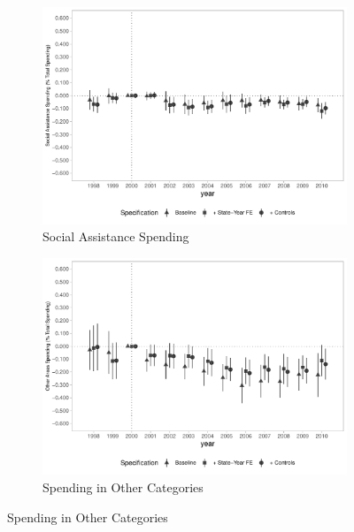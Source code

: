 \begin{figure}[h]
\begin{center}
\begin{subfigure}{0.32\textwidth}
        \centering
        \caption{\scriptsize Social Assistance Spending}\label{fig:finbra4_e}
        \includegraphics[width=\textwidth]{plots/spending/finbra_desp_assist_prev_share_dist_ec29_baseline_dist_ec29_baseline_full.pdf}
    \end{subfigure}
    \begin{subfigure}{0.32\textwidth}
        \centering
        \caption{\scriptsize Spending in Other Categories}\label{fig:finbra4_f}
        \includegraphics[width=\textwidth]{plots/spending/finbra_desp_outros_area_share_dist_ec29_baseline_dist_ec29_baseline_full.pdf}
    \end{subfigure}
    
    \end{center}
    
\end{figure}


